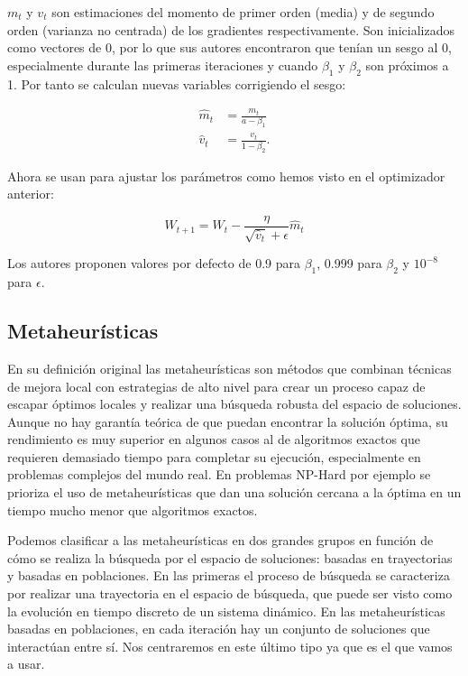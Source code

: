 $m_t$ y $v_t$ son estimaciones del momento de primer orden (media) y de segundo orden (varianza no centrada) de los gradientes respectivamente. Son inicializados como vectores de 0, por lo que sus autores encontraron que tenían un sesgo al 0, especialmente durante las primeras iteraciones y cuando $\beta_1$ y $\beta_2$ son próximos a 1. Por tanto se calculan nuevas variables corrigiendo el sesgo:

\begin{align*}
	\hat{m}_t&=\frac{m_t}{a-\beta_1}\\
	\hat{v}_t&=\frac{v_t}{1-\beta_2}.
\end{align*}

Ahora se usan para ajustar los parámetros como hemos visto en el optimizador anterior:

$$W_{t+1} = W_t - \frac{\eta}{\sqrt{\hat{v}_t} + \epsilon} \hat{m}_t$$

Los autores proponen valores por defecto de 0.9 para $\beta_1$, 0.999 para $\beta_2$ y $10^{-8}$ para $\epsilon$.



\subsection{Metaheurísticas}
\label{sec:mh}

En su definición original las metaheurísticas son métodos que combinan técnicas de mejora local con estrategias de alto nivel para crear un proceso capaz de escapar óptimos locales y realizar una búsqueda robusta del espacio de soluciones. Aunque no hay garantía teórica de que puedan encontrar la solución óptima, su rendimiento es muy superior en algunos casos al de algoritmos exactos que requieren demasiado tiempo para completar su ejecución, especialmente en problemas complejos del mundo real. En problemas NP-Hard por ejemplo se prioriza el uso de metaheurísticas que dan una solución cercana a la óptima en un tiempo mucho menor que algoritmos exactos.

Podemos clasificar a las metaheurísticas en dos grandes grupos en función de cómo se realiza la búsqueda por el espacio de soluciones: basadas en trayectorias y basadas en poblaciones. En las primeras el proceso de búsqueda se caracteriza por realizar una trayectoria en el espacio de búsqueda, que puede ser visto como la evolución en tiempo discreto de un sistema dinámico. En las metaheurísticas basadas en poblaciones, en cada iteración hay un conjunto de soluciones que interactúan entre sí. Nos centraremos en este último tipo ya que es el que vamos a usar.

